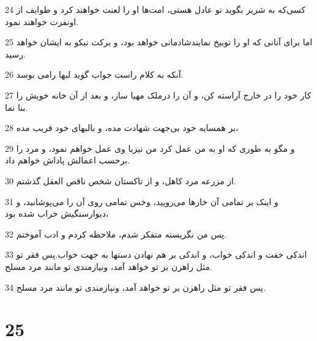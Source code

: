 \par 24 کسی‌که به شریر بگوید تو عادل هستی، امت‌ها او را لعنت خواهند کرد و طوایف از اونفرت خواهند نمود.
\par 25 اما برای آنانی که او را توبیخ نمایندشادمانی خواهد بود، و برکت نیکو به ایشان خواهد رسید.
\par 26 آنکه به کلام راست جواب گوید لبها رامی بوسد.
\par 27 کار خود را در خارج آراسته کن، و آن را درملک مهیا ساز، و بعد از آن خانه خویش را بنا نما.
\par 28 بر همسایه خود بی‌جهت شهادت مده، و بالبهای خود فریب مده،
\par 29 و مگو به طوری که او به من عمل کرد من نیزبا وی عمل خواهم نمود، و مرد را بر‌حسب اعمالش پاداش خواهم داد.
\par 30 از مزرعه مرد کاهل، و از تاکستان شخص ناقص العقل گذشتم.
\par 31 و اینک بر تمامی آن خارها می‌رویید، وخس تمامی روی آن را می‌پوشانید، و دیوارسنگیش خراب شده بود،
\par 32 پس من نگریسته متفکر شدم، ملاحظه کردم و ادب آموختم.
\par 33 اندکی خفت و اندکی خواب، و اندکی بر هم نهادن دستها به جهت خواب.پس فقر تو مثل راهزن بر تو خواهد آمد، ونیازمندی تو مانند مرد مسلح.
\par 34 پس فقر تو مثل راهزن بر تو خواهد آمد، ونیازمندی تو مانند مرد مسلح.
 
\chapter{25}


